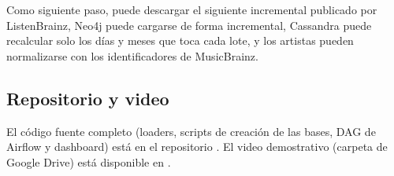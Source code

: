 Como siguiente paso,  puede descargar el siguiente incremental publicado por ListenBrainz, Neo4j puede cargarse de forma incremental, Cassandra puede recalcular solo los días y meses que toca cada lote, y los artistas pueden normalizarse con los identificadores de MusicBrainz.

\subsection{Repositorio y video}

El código fuente completo (loaders, scripts de creación de las bases, DAG de Airflow y dashboard) está en el repositorio \repolink. El video demostrativo (carpeta de Google Drive) está disponible en \videolink.
